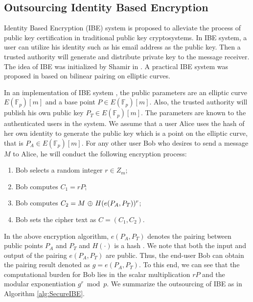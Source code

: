 \documentclass[english,draftcls,onecolumn,11pt]{IEEEtran}
\theoremstyle{definition}
\theoremstyle{plain}
\theoremstyle{plain}
\theoremstyle{definition}
\begin{document}
\subsection{Outsourcing Identity Based Encryption}

Identity Based Encryption (IBE) system is proposed to alleviate the
process of public key certification in traditional public key cryptosystems.
In IBE system, a user can utilize his identity such as his email address\textit{
}as the public key. Then a trusted authority will generate and distribute
private key to the message receiver. The idea of IBE was initialized
by Shamir in \cite{shamir1985identity}. A practical IBE system was
proposed in \cite{boneh2001identity} based on bilinear pairing on
elliptic curves.

In an implementation of IBE system \cite[Chapter 5]{hoffstein2008introduction},
the public parameters are an elliptic curve $E(\mathbb{F}_{p})[m]$
and a base point $P\in E(\mathbb{F}_{p})[m]$. Also, the trusted authority
will publish his own public key $P_{T}\in E(\mathbb{F}_{p})[m]$.
The parameters are known to the authenticated users in the system.
We assume that a user Alice uses the hash of her own identity to generate
the public key which is a point on the elliptic curve, that is $P_{A}\in E(\mathbb{F}_{p})[m]$.
For any other user Bob who desires to send a message $M$ to Alice,
he will conduct the following encryption process:
\begin{enumerate}
\item Bob selects a random integer $r\in Z_{m}$;
\item Bob computes $C_{1}=rP$;
\item Bob computes $C_{2}=M\textsf{ \ensuremath{\oplus}\ }H(e(P_{A},P_{T}))^{r}$;
\item Bob sets the cipher text as $C=(C_{1},C_{2})$.
\end{enumerate}
In the above encryption algorithm, $e(P_{A},P_{T})$ denotes the pairing
between public points $P_{A}$ and $P_{T}$ and $H(\cdot)$ is a hash
. We note that both the input and output of the pairing $e(P_{A},P_{T})$
are public. Thus, the end-user Bob can obtain the pairing result denoted
as $g=e(P_{A},P_{T})$. To this end, we can see that the computational
burden for Bob lies in the scalar multiplication $rP$ and the modular
exponentiation $g^{r}\bmod p$. We summarize the outsourcing of IBE
as in Algorithm \ref{alg:SecureIBE}.
\end{document}
